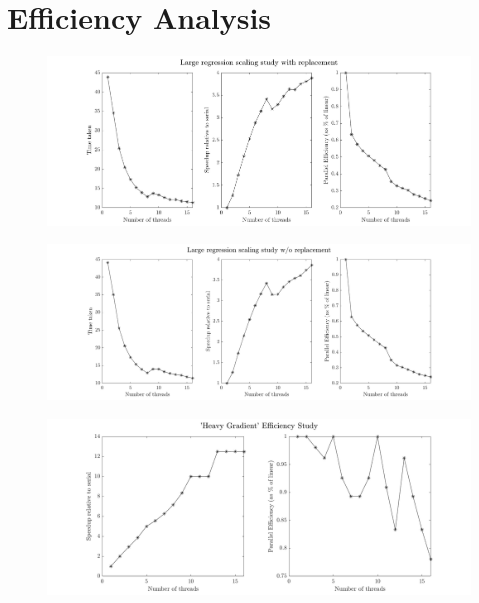 \section{Efficiency Analysis}

\begin{figure}[!htb]
  \centering
  \includegraphics[width=1\textwidth]{./resources/replacement}
\end{figure}

\begin{figure}[!htb]
  \centering
  \includegraphics[width=1\textwidth]{./resources/noreplacement}
\end{figure}

\begin{figure}[!htb]
  \centering
  \includegraphics[width=\textwidth]{./resources/heavy_gradient}
\end{figure}
